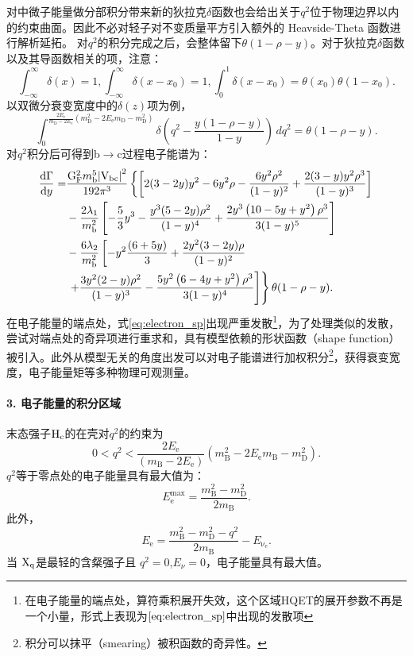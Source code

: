 对中微子能量做分部积分带来新的狄拉克$\delta$函数也会给出关于$q^2$位于物理边界以内的约束曲面。因此不必对轻子对不变质量平方引入额外的 Heavside-Theta 函数进行解析延拓。
对$q^2$的积分完成之后，会整体留下$\theta(1-\rho-y)$。对于狄拉克$\delta$函数以及其导函数相关的项，注意：
\begin{equation}
	\int_{-\infty}^{\infty}\delta(x)=1, \int_{-\infty}^{\infty}\delta(x-x_0)=1, \int_{0}^{1}\delta(x-x_0)=\theta(x_{0})\theta(1-x_0).
\end{equation}
以双微分衰变宽度中的$\delta(z)$项为例，
\begin{equation}
    \int_{0}^{\frac{2 E_{\mathrm{e}}}{m_{\mathrm{D}} - 2 E_{\mathrm{e}}} \left( m_{\mathrm{D}}^2 - 2 E_{\mathrm{e}} m_{\mathrm{D}} - m_{\mathrm{D}}^2 \right)} \delta\left(q^2 - \frac{y(1 - \rho - y)}{1 - y}\right) \, dq^2 = \theta(1 - \rho - y).
\end{equation}
对$q^2$积分后可得到b$\to$c过程电子能谱为：
\begin{equation}
\begin{aligned}
\frac{\mathrm{d} \Gamma}{\mathrm{d} y}= & \frac{\mathrm{G_F^2} m_{\mathrm{b}}^5\mathrm{\left|V_{bc}\right|^2}}{192 \pi^3}\left\{\left[2(3-2 y) y^2-6 y^2 \rho-\frac{6 y^2 \rho^2}{(1-y)^2}+\frac{2(3-y) y^2 \rho^3}{(1-y)^3}\right]\right. \\
& -\frac{2 \lambda_1}{m_{\mathrm{b}}^2}\left[-\frac{5}{3} y^3-\frac{y^3(5-2 y) \rho^2}{(1-y)^4}+\frac{2 y^3\left(10-5 y+y^2\right) \rho^3}{3(1-y)^5}\right] \\
& -\frac{6 \lambda_2}{m_{\mathrm{b}}^2}\left[-y^2 \frac{(6+5 y)}{3}+\frac{2 y^2(3-2 y) \rho}{(1-y)^2}\right. \\
& \left.\left.+\frac{3 y^2(2-y) \rho^2}{(1-y)^3}-\frac{5 y^2\left(6-4 y+y^2\right) \rho^3}{3(1-y)^4}\right]\right\}\theta(1-\rho-y).
\end{aligned}
\label{eq:electron_sp}
\end{equation}
在电子能量的端点处，式\eqref{eq:electron_sp}出现严重发散\footnote{在电子能量的端点处，算符乘积展开失效，这个区域HQET的展开参数不再是一个小量，形式上表现为$\ref{eq:electron_sp}$中出现的发散项}，为了处理类似的发散，尝试对端点处的奇异项进行重求和，具有模型依赖的形状函数（shape function）被引入。此外从模型无关的角度出发可以对电子能谱进行加权积分\footnote{积分可以抹平（smearing）被积函数的奇异性。}，获得衰变宽度，电子能量矩等多种物理可观测量。
\paragraph{3. 电子能量的积分区域}
末态强子$\mathrm{H_{c}}$的在壳对$q^2$的约束为
$$0 < q^2 < \frac{2 E_{\mathrm{e}}}{\left(m_{\mathrm{B}} - 2 E_{\mathrm{e}}\right)} \left( m_{\mathrm{B}}^2 - 2 E_{\mathrm{e}} m_{\mathrm{B}} - m_{\mathrm{D}}^2 \right).$$
$q^2$等于零点处的电子能量具有最大值为：
$$E_{\mathrm{e}}^{\max} = \frac{m_{\mathrm{B}}^2 - m_{\mathrm{D}}^2}{2 m_{\mathrm{B}}}.$$
此外，\begin{equation}
    E_{\mathrm{e}} = \frac{m_{\mathrm{B}}^2 - m_{\mathrm{D}}^2 - q^2}{2 m_{\mathrm{B}}} - E_{\mathrm{\nu_e}}.
\end{equation}
 当 $\mathrm{X_{q}}$是最轻的含粲强子且 $q^2=0$,$E_\nu=0$，电子能量具有最大值。
 
